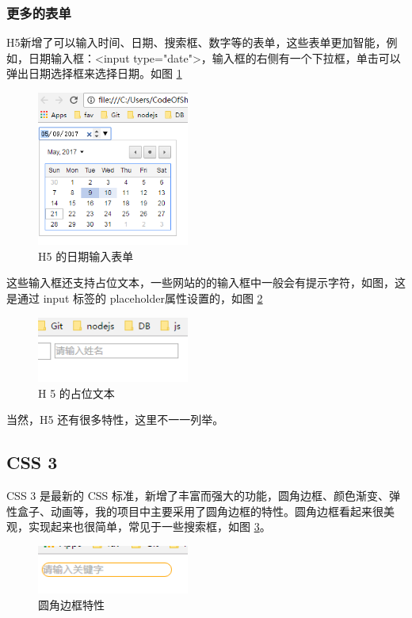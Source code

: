 \documentclass[UTF8]{ctexbook}
\begin{document}
{{            \subsubsection{更多的表单}
              \label{subsubsec:更多的表单}
                H5新增了可以输入时间、日期、搜索框、数字等的表单，这些表单更加智能，例如，日期输入框：<input type="date">，输入框的右侧有一个下拉框，单击可以弹出日期选择框来选择日期。如图 \ref{fig:h5_date}
                \begin{figure}[H]
                  \centering
                  \includegraphics[width=5cm]{./img/h5_date.png}
                  \caption{H5 的日期输入表单}
                  \label{fig:h5_date}
                \end{figure}

                这些输入框还支持占位文本，一些网站的的输入框中一般会有提示字符，如图，这是通过 input 标签的 placeholder属性设置的，如图 \ref{fig:h5_placeholder}
                \begin{figure}[H]
                  \centering
                  \includegraphics[width=5cm]{./img/h5_placeholder.png}
                  \caption{H 5 的占位文本}
                  \label{fig:h5_placeholder}
                \end{figure}
                当然，H5 还有很多特性，这里不一一列举。

        \subsection{CSS 3}
          \label{subsec:css_3}
            CSS 3 是最新的 CSS 标准，新增了丰富而强大的功能，圆角边框、颜色渐变、弹性盒子、动画等，我的项目中主要采用了圆角边框的特性。圆角边框看起来很美观，实现起来也很简单，常见于一些搜索框，如图 \ref{fig:h5_borderradius}。
            \begin{figure}[H]
              \centering
              \includegraphics[width=5cm]{./img/h5_borderradius.png}
              \caption{圆角边框特性}
              \label{fig:h5_borderradius}
            \end{figure}

}}
\end{document}
